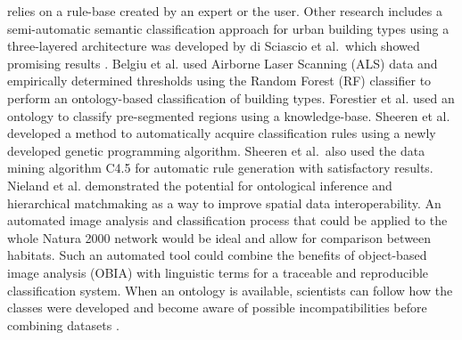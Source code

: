 \documentclass[authoryear, review,12pt,number]{elsarticle}
\begin{document}
relies on a rule-base created by an expert or the user. Other research includes
a semi-automatic semantic classification approach for urban building types using
a three-layered architecture was developed by di Sciascio et al.\ which showed
promising results \citep{diSciascio2013}. Belgiu et al. \citep{Belgiu2014} used
Airborne Laser Scanning (ALS) data and empirically determined thresholds using
the Random Forest (RF) classifier to perform an ontology-based classification of
building types. Forestier et al. \citep{Forestier2012470} used an ontology to
classify pre-segmented regions using a knowledge-base. Sheeren et al.
\citep{Sheeren2006ML} developed a method to automatically acquire classification
rules using a newly developed genetic programming algorithm.
Sheeren et al.\ also used the data mining algorithm C4.5 for automatic rule
generation with satisfactory results. Nieland et al. \citep{Nieland2015}
demonstrated the potential for ontological inference and hierarchical
matchmaking as a way to improve spatial data interoperability. An automated
image analysis and classification process that could be applied to the whole
Natura 2000 network would be ideal and allow for comparison between habitats.
Such an automated tool could combine the benefits of object-based image analysis
(OBIA) with linguistic terms for a traceable and reproducible classification
system. When an ontology is available, scientists can follow how the classes
were developed and become aware of possible incompatibilities before combining
datasets \citep{Janowicz2012}.




\end{document}
